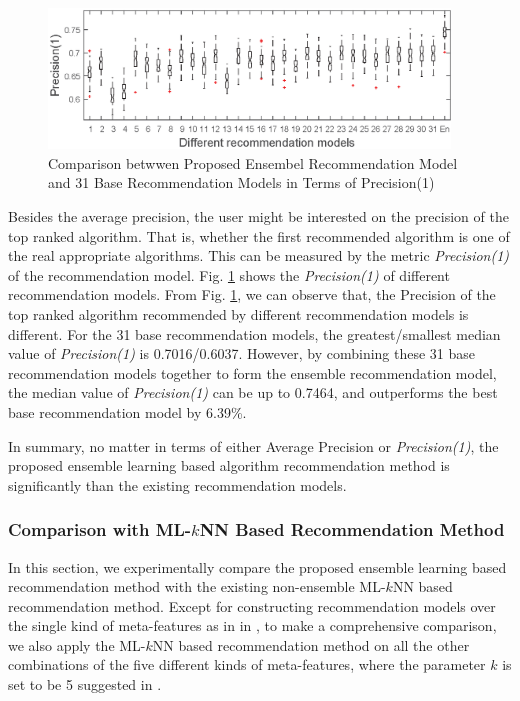 \documentclass[prodmode,acmtkdd]{acmsmall}
\begin{document}
\begin{figure}[!h]
    \centering
    \includegraphics[width=0.95\textwidth]{Figures/FirstPrecisionComparison}
    \caption{Comparison betwwen Proposed Ensembel Recommendation Model and 31 Base Recommendation Models in Terms of Precision(1)}\label{Fig:CompOnPrecision1}
\end{figure}

Besides the average precision, the user might be interested on the
precision of the top ranked algorithm. That is, whether the first
recommended algorithm is one of the real appropriate algorithms.
This can be measured by the metric \emph{Precision(1)} of the
recommendation model. Fig. \ref{Fig:CompOnPrecision1} shows the
\emph{Precision(1)} of different recommendation models. From Fig.
\ref{Fig:CompOnPrecision1}, we can observe that, the Precision of
the top ranked algorithm recommended by different recommendation
models is different. For the 31 base recommendation models, the
greatest/smallest median value of \emph{Precision(1)} is
0.7016/0.6037. However, by combining these 31 base recommendation
models together to form the ensemble recommendation model, the
median value of \emph{Precision(1)} can be up to 0.7464, and
outperforms the best base recommendation model by 6.39\%.

In summary, no matter in terms of either Average Precision or
\emph{Precision(1)}, the proposed ensemble learning based algorithm
recommendation method is significantly than the existing
recommendation models.

\subsubsection{Comparison with ML-$k$NN Based Recommendation Method}

In this section, we experimentally compare the proposed ensemble
learning based recommendation method with the existing non-ensemble
ML-$k$NN based recommendation
method. Except for constructing recommendation models over the single kind of meta-features as in  in \cite{wang2014generic}, to make a comprehensive
comparison, we also apply the ML-$k$NN based recommendation method
on all the other combinations of the five different kinds of meta-features, where the parameter $k$ is set to be 5 suggested
in \cite{wang2014generic}.
\end{document}
